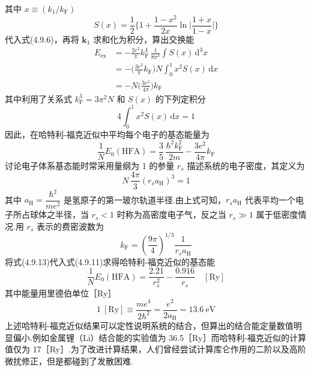 其中 $x\equiv\left(k_{1}/k_{\mathrm{F}}\right)$
\begin{equation}
  S(x)=\frac{1}{2}\bigg\{1+\frac{1-x^{2}}{2x}
  \ln\bigg|\frac{1+x}{1-x}\bigg|\bigg\}
\end{equation}
代入式(4.9.6)，再将 $\boldsymbol{k}_{1}$ 求和化为积分，算出交换能
\begin{equation}
\begin{aligned}
  E_{\mathrm{ex}}&=-\frac{2e^{2}}{\pi}k_{\mathrm{F}}^{4}\,\frac{1}{8\pi^{3}}
  \int S(x)\,\mathrm{d}^{3}x\\
  &=-\bigg(\frac{3e^{2}}{\pi}k_{\mathrm{F}}\bigg)N\int_{0}^{1}x^{2}S(x)\,\mathrm{d}x\\
  &=-N\bigg(\frac{3e^{2}}{4\pi}\bigg)k_{\mathrm{F}}
\end{aligned}
\end{equation}
其中利用了关系式 $k_{\mathrm{F}}^{3}=3\pi^{2}N$ 和 $S(x)$ 的下列定积分
\begin{equation}
  4\int_{0}^{1}x^{2}S(x)\,\mathrm{d}x=1
\end{equation}
因此，在哈特利-福克近似中平均每个电子的基态能量为
\begin{equation}
  \frac{1}{N}E_{0}\left(\mathrm{HFA}\right)
  =\frac{3}{5}\,\frac{\hbar^{2}k_{\mathrm{F}}^{2}}{2m}
  -\frac{3e^{2}}{4\pi}k_{\mathrm{F}}
\end{equation}
讨论电子体系基态能时常采用量纲为 1 的参量 $r_{s}$ 描述系统的电子密度，其定义为
\begin{equation}
  N\,\frac{4\pi}{3}\left(r_{s}a_{\mathrm{H}}\right)^{3}=1
\end{equation}
其中 $a_{\mathrm{H}}=\dfrac{\hbar^{2}}{me^{2}}$ 是氢原子的第一玻尔轨道半径.由上式可知，$r_{s}a_{\mathrm{H}}$ 代表平均一个电子所占球体之半径，当 $r_{s}<1$ 时称为高密度电子气，反之当 $r_{s}\gg 1$ 属于低密度情况.用 $r_{s}$ 表示的费密波数为
\begin{equation}
  k_{\mathrm{F}}=\left(\frac{9\pi}{4}\right)^{1/3}
  \frac{1}{r_{s}a_{\mathrm{H}}}
\end{equation}
将式(4.9.13)代入式(4.9.11)求得哈特利-福克近似的基态能
\begin{equation}
  \frac{1}{N}E_{0}\left(\mathrm{HFA}\right)
  =\frac{2.21}{r_{s}^{2}}-\frac{0.916}{r_{s}}\quad\left[\mathrm{Ry}\right]
\end{equation}
其中能量用里德伯单位［Ry］
\begin{equation}
  1\ \left[\mathrm{Ry}\right]\equiv\frac{me^{4}}{2\hbar^{2}}
  =\frac{e^{2}}{2a_{\mathrm{H}}}=13.6\ \mathrm{eV}
\end{equation}
上述哈特利-福克近似结果可以定性说明系统的结合，但算出的结合能定量数值明显偏小.例如金属锂（Li）结合能的实验值为 36.5［Ry］而哈特利-福克近似的计算值仅为 17［Ry］.为了改进计算结果，人们曾经尝试计算库仑作用的二阶以及高阶微扰修正，但是都碰到了发散困难.

